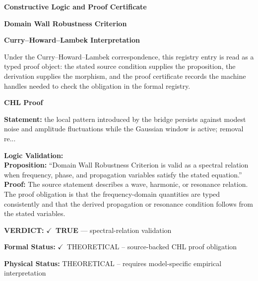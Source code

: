 \clearpage
\begingroup\tzpsupportsetup
\noindent\textbf{\fontsize{10.8pt}{12.8pt}\selectfont [ID 0149] Constructive Logic and Proof Certificate}\par
\noindent\textbf{\fontsize{10pt}{12pt}\selectfont Domain Wall Robustness Criterion}\par
\vspace{0.45em}
\begingroup
\footnotesize
\setlength{\parskip}{0.22em}
\setlength{\parindent}{0pt}
\noindent\textbf{Curry--Howard--Lambek Interpretation}\par
Under the Curry--Howard--Lambek correspondence, this registry entry is read as a typed proof
object: the stated source condition supplies the proposition, the derivation supplies the
morphism, and the proof certificate records the machine handles needed to check the obligation
in the formal registry.

\vspace{0.45em}
\noindent\textbf{CHL Proof}\par
\textbf{Statement:} the local pattern introduced by the bridge persists against modest noise and amplitude
fluctuations while the Gaussian window is active; removal re...

\textbf{Logic Validation:}\\
\textbf{Proposition:} ``Domain Wall Robustness Criterion is valid as a spectral relation when frequency, phase,
and propagation variables satisfy the stated equation.''\\
\textbf{Proof:} The source statement describes a wave, harmonic, or resonance relation. The proof
obligation is that the frequency-domain quantities are typed consistently and that the
derived propagation or resonance condition follows from the stated variables.

\textbf{VERDICT:} \ensuremath{\checkmark}\ \textbf{TRUE} --- spectral-relation validation

\textbf{Formal Status:} \ensuremath{\checkmark}\ THEORETICAL -- source-backed CHL proof obligation

\textbf{Physical Status:} THEORETICAL -- requires model-specific empirical interpretation
\par\vspace{0.45em}
\par
\ifTZPDarkEdition
{}
\fi
\endgroup
\endgroup
